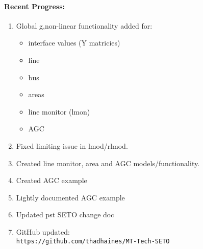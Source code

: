 \documentclass[12pt]{article}
\begin{document}
\begin{multicols}{2}
\raggedright

\paragraph{Recent Progress:}
	\begin{enumerate}
		\itemsep0em 
		\item Global g,non-linear functionality added for: %
		\begin{minipage}{\linewidth}
		\begin{multicols}{2}
				\begin{itemize}
		\itemsep0em 
				\footnotesize
				\raggedright
					\item interface values (Y matricies)
					\item line
					\item bus
					\item areas
					\item line monitor (lmon)
					\item AGC
				\end{itemize}
		\end{multicols}
		\end{minipage}
		\item Fixed limiting issue in lmod/rlmod.
		\item Created line monitor, area and AGC models/functionality.
		\item Created AGC example
		\item Lightly documented AGC example
		\item Updated pst SETO change doc
		
		\item GitHub updated:\\
	{\footnotesize	\verb|https://github.com/thadhaines/MT-Tech-SETO| }\\
	\end{enumerate}
	


\end{multicols}
\end{document}
